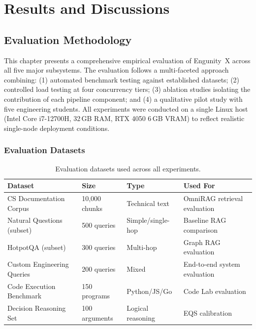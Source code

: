 \chapter{Results and Discussions}
\label{chap:results}

\section{Evaluation Methodology}
\label{sec:eval-methodology}

This chapter presents a comprehensive empirical evaluation of Engunity~X across all five major subsystems. The evaluation follows a multi-faceted approach combining: (1) automated benchmark testing against established datasets; (2) controlled load testing at four concurrency tiers; (3) ablation studies isolating the contribution of each pipeline component; and (4) a qualitative pilot study with five engineering students. All experiments were conducted on a single Linux host (Intel Core i7-12700H, 32\,GB RAM, RTX 4050 6\,GB VRAM) to reflect realistic single-node deployment conditions.

\subsection{Evaluation Datasets}
\label{subsec:datasets}

\begin{table}[ht]
    \centering
    \caption{Evaluation datasets used across all experiments.}
    \label{tab:eval-datasets}
    \renewcommand{\arraystretch}{1.3}
    \begin{tabular}{p{3cm} p{2cm} p{2cm} p{3.5cm}}
        \toprule
        \textbf{Dataset} & \textbf{Size} & \textbf{Type} & \textbf{Used For} \\
        \midrule
        CS Documentation Corpus & 10,000 chunks & Technical text & OmniRAG retrieval evaluation \\
        Natural Questions (subset) & 500 queries & Simple/single-hop & Baseline RAG comparison \\
        HotpotQA (subset) & 300 queries & Multi-hop & Graph RAG evaluation \\
        Custom Engineering Queries & 200 queries & Mixed & End-to-end system evaluation \\
        Code Execution Benchmark & 150 programs & Python/JS/Go & Code Lab evaluation \\
        Decision Reasoning Set & 100 arguments & Logical reasoning & EQS calibration \\
        \bottomrule
    \end{tabular}
\end{table}

